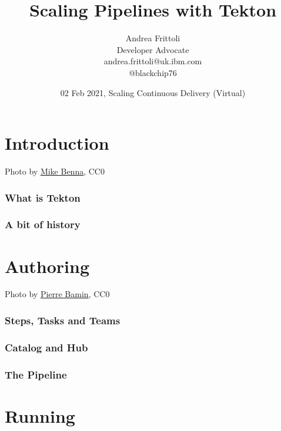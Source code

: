 \documentclass[aspectratio=169,11pt,hyperref={colorlinks=true}]{beamer}
\title{Scaling Pipelines with Tekton}
\date[Scaling Continuous Delivery]{02 Feb 2021, Scaling Continuous Delivery (Virtual)}
\author[Andrea]{
  Andrea Frittoli \\
  Developer Advocate \\
  andrea.frittoli@uk.ibm.com \\
  @blackchip76
}
\begin{document}
\begin{frame}[noframenumbering]
\titlepage{}
\end{frame}

\section{Introduction}

\begin{sectionwithpic}{Photo by \href{https://unsplash.com/@mbenna}{\underline{Mike Benna}}, CC0}
\end{sectionwithpic}

\begin{grayframe}
  \frametitle{What is Tekton}
\end{grayframe}

\begin{grayframe}
  \frametitle{A bit of history}
\end{grayframe}

\section{Authoring}

\begin{sectionwithpicrx}{Photo by \href{https://unsplash.com/@bamin}{\underline{Pierre Bamin}}, CC0}
\end{sectionwithpicrx}

\begin{grayframe}
  \frametitle{Steps, Tasks and Teams}
\end{grayframe}

\begin{grayframe}
  \frametitle{Catalog and Hub}
\end{grayframe}

\begin{grayframe}
  \frametitle{The Pipeline}
\end{grayframe}

\section{Running}
\end{document}
